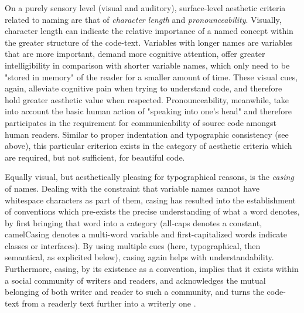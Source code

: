 On a purely sensory level (visual and auditory), surface-level aesthetic criteria related to naming are that of \emph{character length} and \emph{pronounceability}. Visually, character length can indicate the relative importance of a named concept within the greater structure of the code-text. Variables with longer names are variables that are more important, demand more cognitive attention, offer greater intelligibility in comparison with shorter variable names, which only need to be "stored in memory" of the reader for a smaller amount of time. These visual cues, again, alleviate cognitive pain when trying to understand code, and therefore hold greater aesthetic value when respected. Pronounceability, meanwhile, take into account the basic human action of "speaking into one's head" and therefore participates in the requirement for communicability of source code amongst human readers. Similar to proper indentation and typographic consistency (see above), this particular criterion exists in the category of aesthetic criteria which are required, but not sufficient, for beautiful code.

Equally visual, but aesthetically pleasing for typographical reasons, is the \emph{casing} of names. Dealing with the constraint that variable names cannot have whitespace characters as part of them, casing has resulted into the establishment of conventions which pre-exists the precise understanding of what a word denotes, by first bringing that word into a category (all-caps denotes a constant, camelCasing denotes a multi-word variable and first-capitalized words indicate classes or interfaces). By using multiple cues (here, typographical, then semantical, as explicited below), casing again helps with understandability. Furthermore, casing, by its existence as a convention, implies that it exists within a social community of writers and readers, and acknowledges the mutual belonging of both writer and reader to such a community, and turns the code-text from a readerly text further into a writerly one \citep{barthes_bruissement_1984}.

